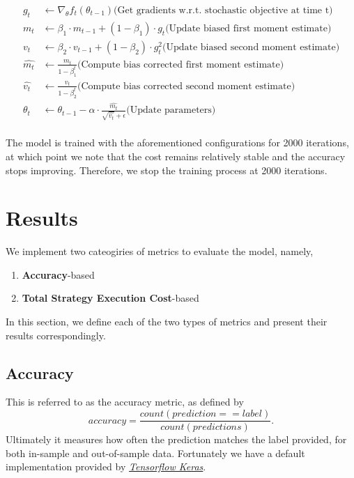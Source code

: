 \documentclass[12pt]{extarticle}
\begin{document}
\begin{equation*}
  \begin{split}
    g_t &\leftarrow \nabla_{\theta} f_t (\theta_{t-1}) \text{(Get gradients w.r.t. stochastic objective at time t)} \\
    m_t &\leftarrow \beta_1 \cdot m_{t-1} + (1-\beta_1) \cdot g_t \text{(Update biased first moment estimate)} \\
    v_t &\leftarrow \beta_2 \cdot v_{t-1} + (1-\beta_2) \cdot g_t^2 \text{(Update biased second moment estimate)} \\
    \hat{m_{t}} &\leftarrow \frac{m_t}{1 - \beta_1^t} \text{(Compute bias corrected first moment estimate)} \\
    \hat{v_{t}} &\leftarrow \frac{v_t}{1 - \beta_2^t} \text{(Compute bias corrected second moment estimate)} \\
    \theta_t &\leftarrow \theta_{t-1} - \alpha \cdot \frac{\hat{m_t}}{\sqrt{\hat{v_t}} + \epsilon} \text{(Update parameters)}
  \end{split}
\end{equation*}
\\


\noindent The model is trained with the aforementioned configurations for 2000 iterations,
at which point we note that the cost remains relatively stable and the accuracy stops
improving. Therefore, we stop the training process at 2000 iterations.

\section{Results} \label{results}

We implement two cateogiries of metrics to evaluate the model, namely,
\begin{enumerate}
  \item \textbf{Accuracy}-based
  \item \textbf{Total Strategy Execution Cost}-based
\end{enumerate}
In this section, we define each of the two types of metrics and present their results correspondingly.

\subsection{Accuracy}
This is referred to as the accuracy metric, as defined by
$$\textit{accuracy} = \frac{\textit{count}(\textit{prediction} == \textit{label})}{\textit{count}(\textit{predictions})}.$$
Ultimately it measures how often the prediction matches the label provided, for both in-sample and out-of-sample data.
Fortunately we have a default implementation provided by
\href{https://github.com/tensorflow/tensorflow/blob/r1.13/tensorflow/python/ops/metrics_impl.py}{\textit{Tensorflow Keras}}. \\
\end{document}
